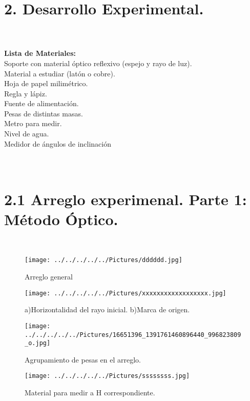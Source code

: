 \documentclass[10pt,a4paper]{article}
\begin{document}
\section*{2.  Desarrollo Experimental.}\\

 \\
\textbf{Lista de Materiales:} \\
Soporte con material \'{o}ptico reflexivo (espejo y rayo de luz).\\
Material a estudiar (lat\'{o}n o cobre). \\
Hoja de papel milim\'{e}trico. \\
Regla y l\'{a}piz. \\
Fuente de alimentaci\'{o}n.\\
Pesas de distintas masas. \\
Metro para medir. \\
Nivel de agua. \\
Medidor de \'{a}ngulos de inclinaci\'{o}n \\
\\
\\
\section*{2.1 Arreglo experimenal. Parte 1: M\'{e}todo \'{O}ptico.} \\

\begin{figure}[hbtp]
\centering
\texttt{[image: ../../../../../Pictures/dddddd.jpg]}  
\caption{Arreglo general}
\end{figure}

\begin{figure}[hbtp]
\centering
\texttt{[image: ../../../../../Pictures/xxxxxxxxxxxxxxxxxx.jpg]}  
\caption{a)Horizontalidad del rayo inicial.  b)Marca de origen. }
\end{figure}

\begin{figure}[hbtp]
\centering
\texttt{[image: ../../../../../Pictures/16651396\_1391761460896440\_996823809\_o.jpg]} 
\caption{Agrupamiento de pesas en el arreglo.}
\end{figure}

\begin{figure}[hbtp]
\centering
\texttt{[image: ../../../../../Pictures/ssssssss.jpg]} 
\caption{Material para medir a H correspondiente.}
\end{figure}
\pagebreak 
\end{document}
